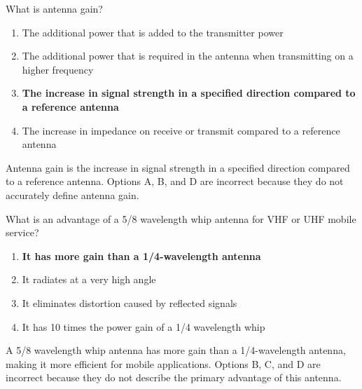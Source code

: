 
\begin{tcolorbox}[colback=gray!10!white,colframe=black!75!black,title={T9A11}]
What is antenna gain?
\begin{enumerate}[label=\Alph*,noitemsep]
    \item The additional power that is added to the transmitter power
    \item The additional power that is required in the antenna when transmitting on a higher frequency
    \item \textbf{The increase in signal strength in a specified direction compared to a reference antenna}
    \item The increase in impedance on receive or transmit compared to a reference antenna
\end{enumerate}
\end{tcolorbox}
Antenna gain is the increase in signal strength in a specified direction compared to a reference antenna. Options A, B, and D are incorrect because they do not accurately define antenna gain.


\begin{tcolorbox}[colback=gray!10!white,colframe=black!75!black,title={T9A12}]
What is an advantage of a 5/8 wavelength whip antenna for VHF or UHF mobile service?
\begin{enumerate}[label=\Alph*,noitemsep]
    \item \textbf{It has more gain than a 1/4-wavelength antenna}
    \item It radiates at a very high angle
    \item It eliminates distortion caused by reflected signals
    \item It has 10 times the power gain of a 1/4 wavelength whip
\end{enumerate}
\end{tcolorbox}
A 5/8 wavelength whip antenna has more gain than a 1/4-wavelength antenna, making it more efficient for mobile applications. Options B, C, and D are incorrect because they do not describe the primary advantage of this antenna.


